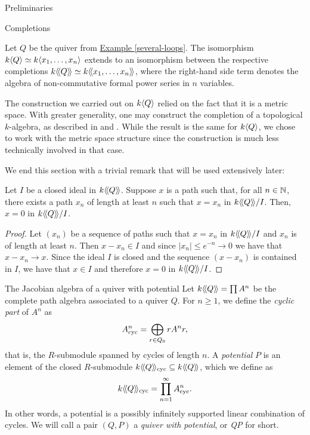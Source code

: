 \begin{chapter}{Preliminaries}
\begin{section}{Completions}
\begin{exmp}Let $Q$ be the quiver from \hyperref[several-loops]{Example \ref*{several-loops}}. The isomorphism $k\langle Q\rangle\simeq k\langle x_1,\dots,x_n\rangle$ extends to an isomorphism between the respective completions $k\langle\!\langle Q\rangle\!\rangle\simeq k\langle\!\langle x_1,\dots,x_n\rangle\!\rangle$, where the right-hand side term denotes the algebra of non-commutative formal power series in $n$ variables.
\end{exmp}

The construction we carried out on $k\langle Q\rangle$ relied on the fact that it is a metric space. With greater generality, one may construct the completion of a topological $k$-algebra, as described in \cite{AM69} and \cite{Bou98}. While the result is the same for $k\langle Q\rangle$, we chose to work with the metric space structure since the construction is much less technically involved in that case.

We end this section with a trivial remark that will be used extensively later:

\begin{obs}\label{arbitrarily-long} Let $I$ be a closed ideal in $k\langle\!\langle Q\rangle\!\rangle$. Suppose $x$ is a path such that, for all $n\in \mathbb{N}$, there exists a path $x_n$ of length at least $n$ such that $x=x_n$ in $k\langle\!\langle Q\rangle\!\rangle/I$. Then, $x=0$ in $k\langle\!\langle Q\rangle\!\rangle/I$.
\end{obs}
\begin{proof} Let $(x_n)$ be a sequence of paths such that $x=x_n$ in $k\langle\!\langle Q\rangle\!\rangle/I$ and $x_n$ is of length at least $n$. Then $x-x_n\in I$ and since $|x_n|\leq e^{-n}\to 0$ we have that $x-x_n\to x$. Since the ideal $I$ is closed and the sequence $(x-x_n)$ is contained in $I$, we have that $x\in I$ and therefore $x=0$ in $k\langle\!\langle Q\rangle\!\rangle/I$.
\end{proof}
\end{section}

\begin{section}{The Jacobian algebra of a quiver with potential}
Let $k\langle\!\langle Q\rangle\!\rangle=\prod A^n$ be the complete path algebra associated to a quiver $Q$. For $n\geq 1$, we define the \emph{cyclic part} of $A^n$ as
\[
A^n_{\mathrm{cyc}} = \bigoplus_{r\in Q_0} rA^nr,
\]
that is, the $R$-submodule spanned by cycles of length $n$. A \emph{potential} $P$ is an element of the closed $R$-submodule $k\langle\!\langle Q\rangle\!\rangle_{\mathrm{cyc}}\subseteq k\langle\!\langle Q\rangle\!\rangle$, which we define as
\[
k\langle\!\langle Q\rangle\!\rangle_{\mathrm{cyc}}=\prod_{n=1}^\infty A^n_{\mathrm{cyc}}.
\]
In other words, a potential is a possibly infinitely supported linear combination of cycles. We will call a pair $(Q,P)$ a \emph{quiver with potential}, or \emph{QP} for short.


\end{section}
\end{chapter}
